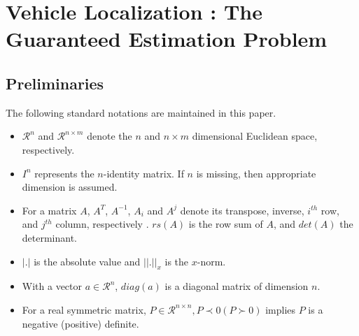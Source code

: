 \chapter{Vehicle Localization : The Guaranteed Estimation Problem} \label{ch:problem}
\section{Preliminaries}
The following standard notations are maintained in this paper.
\begin{itemize}
\item{$\mathcal{R}^n$ and $\mathcal{R}^{n \times m}$ denote the $n$ and $n \times m$ dimensional Euclidean space, respectively.}
\item{$I^n$ represents the $n$-identity matrix. If $n$ is missing, then appropriate dimension is assumed.}
\item{For a matrix $A$, $A^T$, $A^{-1}$, $A_{i}$ and $A^{j}$ denote its transpose, inverse, $i^{th}$ row, and $j^{th}$ column, respectively . $rs(A)$ is the row sum of $A$, and $det(A)$ the determinant.}
\item{$|.|$ is the absolute value and $||.||_{x}$ is the $x$-norm.}
\item{With a vector $a \in \mathcal{R}^n$, $diag(a)$ is a diagonal matrix of dimension $n$.}
\item{For a real symmetric matrix, $P \in \mathcal{R}^{n \times n}, P \prec 0(P \succ 0)$ implies $P$ is a negative (positive) definite.}
\end{itemize}
